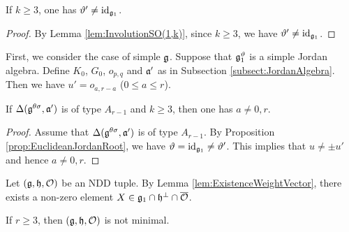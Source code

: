 \begin{lemma} \label{lem:NonTrivialInvolution}
	If $k \geq 3$, one has $\vartheta' \neq \operatorname{id}_{\mathfrak{g}_1}$.
\end{lemma}

\begin{proof}
	By Lemma \ref{lem:InvolutionSO(1,k)}, since $k \geq 3$, we have $\vartheta' \neq \operatorname{id}_{\mathfrak{g}_1}$.
\end{proof}

First, we consider the case of simple $\mathfrak{g}$.
Suppose that $\mathfrak{g}_1^\vartheta$ is a simple Jordan algebra.
Define $K_0$, $G_0$, $o_{p,q}$ and $\mathfrak{a'}$ as in Subsection \ref{subsect:JordanAlgebra}.
Then we have $u' = o_{a, r - a}$ ($0\leq a \leq r$).

\begin{lemma} \label{lem:NontrivialTripotent}
	If $\Delta(\mathfrak{g}^{\theta\sigma}, \mathfrak{a'})$ is of type $A_{r-1}$ and $k \geq 3$, then one has $a \neq 0, r$.
\end{lemma}

\begin{proof}
	Assume that $\Delta(\mathfrak{g}^{\theta\sigma}, \mathfrak{a'})$ is of type $A_{r-1}$.
	By Proposition \ref{prop:EuclideanJordanRoot}, we have $\vartheta = \operatorname{id}_{\mathfrak{g}_1} \neq \vartheta'$.
	This implies that $u \neq \pm u'$ and hence $a \neq 0, r$.
\end{proof}

Let $(\mathfrak{g}, \mathfrak{h}, \mathcal{O})$ be an NDD tuple.
By Lemma \ref{lem:ExistenceWeightVector}, there exists a non-zero element $X \in \mathfrak{g}_1 \cap \mathfrak{h}^\perp \cap \overline{\mathcal{O}}$.

\begin{lemma} \label{lem:NonMinimalRank3}
	If $r \geq 3$, then $(\mathfrak{g}, \mathfrak{h}, \mathcal{O})$ is not minimal.
\end{lemma}

